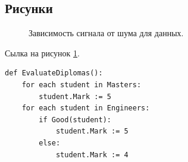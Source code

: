 \subsection{Рисунки}
\begin{figure}[H]
	\caption{Зависимость сигнала от шума для данных.}
	\label{ris:image}
\end{figure}

Сылка на рисунок \ref{ris:image}.


\begin{lstlisting}[style=pseudocode,caption={Алгоритм оценки дипломных работ}]
def EvaluateDiplomas():
	for each student in Masters:
		student.Mark := 5
	for each student in Engineers:
		if Good(student):
			student.Mark := 5
		else:
			student.Mark := 4
\end{lstlisting}


